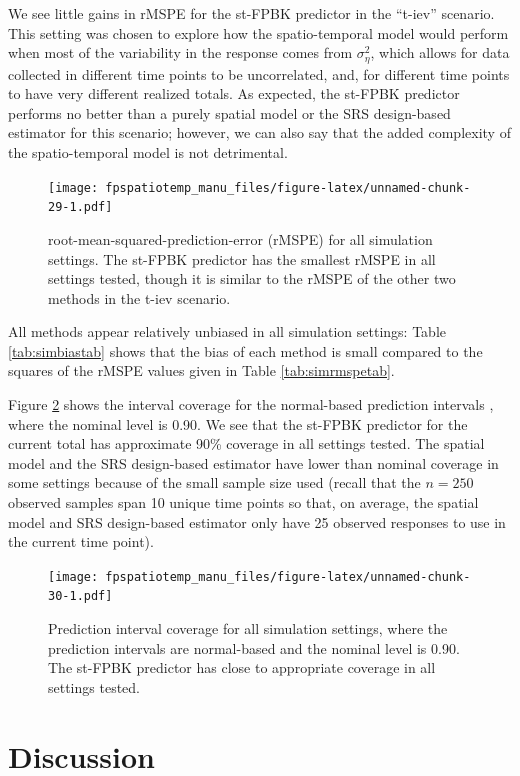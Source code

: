 \documentclass[]{interact}
\theoremstyle{plain}%
\theoremstyle{definition}
\theoremstyle{remark}
\begin{document}
We see little gains in rMSPE for the st-FPBK predictor in the ``t-iev''
scenario. This setting was chosen to explore how the spatio-temporal
model would perform when most of the variability in the response comes
from \(\sigma^2_{\eta}\), which allows for data collected in different
time points to be uncorrelated, and, for different time points to have
very different realized totals. As expected, the st-FPBK predictor
performs no better than a purely spatial model or the SRS design-based
estimator for this scenario; however, we can also say that the added
complexity of the spatio-temporal model is not detrimental.

\begin{figure}
\centering
\texttt{[image: fpspatiotemp\_manu\_files/figure-latex/unnamed-chunk-29-1.pdf]}
\caption{\label{fig:rmspe} root-mean-squared-prediction-error (rMSPE)
for all simulation settings. The st-FPBK predictor has the smallest
rMSPE in all settings tested, though it is similar to the rMSPE of the
other two methods in the t-iev scenario.}
\end{figure}

All methods appear relatively unbiased in all simulation settings: Table
\ref{tab:simbiastab} shows that the bias of each method is small
compared to the squares of the rMSPE values given in Table
\ref{tab:simrmspetab}.

Figure \ref{fig:pi} shows the interval coverage for the normal-based
prediction intervals \citep{smith1980central}, where the nominal level
is 0.90. We see that the st-FPBK predictor for the current total has
approximate 90\% coverage in all settings tested. The spatial model and
the SRS design-based estimator have lower than nominal coverage in some
settings because of the small sample size used (recall that the
\(n = 250\) observed samples span 10 unique time points so that, on
average, the spatial model and SRS design-based estimator only have 25
observed responses to use in the current time point).

\begin{figure}
\centering
\texttt{[image: fpspatiotemp\_manu\_files/figure-latex/unnamed-chunk-30-1.pdf]}
\caption{\label{fig:pi} Prediction interval coverage for all simulation
settings, where the prediction intervals are normal-based and the
nominal level is 0.90. The st-FPBK predictor has close to appropriate
coverage in all settings tested.}
\end{figure}

\section{Discussion} \label{section:Discussion}
\end{document}
